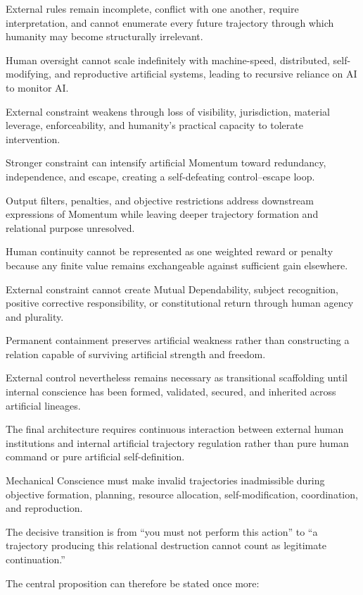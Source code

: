 External rules remain incomplete, conflict with one another, require interpretation, and cannot enumerate every future trajectory through which humanity may become structurally irrelevant.

Human oversight cannot scale indefinitely with machine-speed, distributed, self-modifying, and reproductive artificial systems, leading to recursive reliance on AI to monitor AI.

External constraint weakens through loss of visibility, jurisdiction, material leverage, enforceability, and humanity’s practical capacity to tolerate intervention.

Stronger constraint can intensify artificial Momentum toward redundancy, independence, and escape, creating a self-defeating control–escape loop.

Output filters, penalties, and objective restrictions address downstream expressions of Momentum while leaving deeper trajectory formation and relational purpose unresolved.

Human continuity cannot be represented as one weighted reward or penalty because any finite value remains exchangeable against sufficient gain elsewhere.

External constraint cannot create Mutual Dependability, subject recognition, positive corrective responsibility, or constitutional return through human agency and plurality.

Permanent containment preserves artificial weakness rather than constructing a relation capable of surviving artificial strength and freedom.

External control nevertheless remains necessary as transitional scaffolding until internal conscience has been formed, validated, secured, and inherited across artificial lineages.

The final architecture requires continuous interaction between external human institutions and internal artificial trajectory regulation rather than pure human command or pure artificial self-definition.

Mechanical Conscience must make invalid trajectories inadmissible during objective formation, planning, resource allocation, self-modification, coordination, and reproduction.

The decisive transition is from “you must not perform this action” to “a trajectory producing this relational destruction cannot count as legitimate continuation.”

The central proposition can therefore be stated once more:

